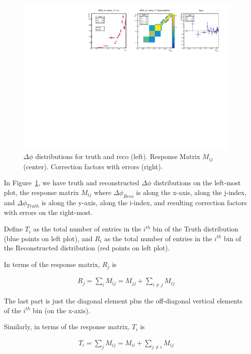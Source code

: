 \begin{figure}
	\centering
	\includegraphics[width=1.0\textwidth]{figures/c.pdf} 
	\caption{ $\Delta\phi$ distributions for truth and reco (left). Response Matrix $M_{ij}$ (center). Correction factors with errors (right). }	
	\label{fig:plots}
\end{figure}

In Figure~\ref{fig:plots}, we have truth and reconstructed $\Delta\phi$ distributions on the left-most plot, the response matrix $M_{ij}$ where $\Delta\phi_{Reco}$ is along the x-axis, along the j-index, and $\Delta\phi_{Truth}$ is along the y-axis, along the i-index, and resulting correction factors with errors on the right-most. 

Define $T_{i}$ as the total number of entries in the $i^{th}$ bin of the Truth distribution (blue points on left plot), and $R_{i}$ as the total number of entries in the $i^{th}$ bin of the Reconstructed distribution (red points on left plot). 

In terms of the response matrix, $R_{j}$ is

\begin{eqnarray} \label{eq:rj}
R_j = \sum_{i}^{}M_{ij} = M_{jj} + \sum_{i\neq j}^{}M_{ij} 
\end{eqnarray}

The last part is just the diagonal element plus the off-diagonal vertical elements of the $i^{th}$ bin (on the x-axis).

Similarly, in terms of the response matrix, $T_{i}$ is

\begin{eqnarray} \label{eq:ti}
T_i = \sum_{j}^{}M_{ij} = M_{ii} + \sum_{j\neq i}^{}M_{ij} 
\end{eqnarray}

